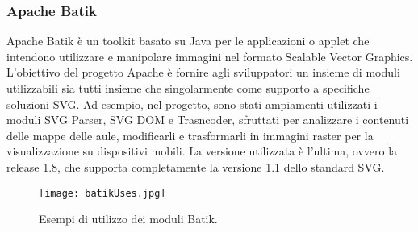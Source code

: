 \subsubsection*{Apache Batik}
Apache Batik è un toolkit basato su Java per le applicazioni o applet che intendono utilizzare e manipolare immagini nel formato  Scalable Vector Graphics.
L'obiettivo del progetto Apache è fornire agli sviluppatori un insieme di moduli utilizzabili sia tutti insieme che singolarmente come supporto a specifiche soluzioni SVG. Ad esempio, nel progetto, sono stati ampiamenti utilizzati i moduli SVG Parser, SVG DOM e Trasncoder, sfruttati per analizzare i contenuti delle mappe delle aule, modificarli e trasformarli in immagini raster per la visualizzazione su dispositivi mobili.
La versione utilizzata è l'ultima, ovvero la release 1.8, che supporta completamente la versione 1.1 dello standard SVG.
\begin{figure}[!htb]
\centering%
\texttt{[image: batikUses.jpg]}%
\caption{Esempi di utilizzo dei moduli Batik. }\label{fig:batikUsi}%
\end{figure}
